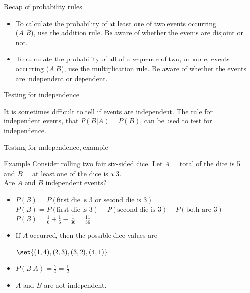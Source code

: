 \documentclass[xcolor=table]{beamer}
\begin{document}
\begin{frame}{Recap of probability rules}
\begin{block}{}
\begin{itemize}
\item To calculate the probability of at least one of two events occurring\\ ($A$  $B$), use the addition rule. Be aware of whether the events are disjoint or not.

\pause
\item To calculate  the probability of all of a sequence of two, or more, events occurring ($A$  $B$), use the multiplication rule. Be aware of whether the events are independent or dependent.
\end{itemize}
\end{block}
\end{frame}

\begin{frame}{Testing for independence}
\begin{block}{}
It is sometimes difficult to tell if events are independent. The rule for independent events, that $P(B|A) = P(B)$, can be used to test for independence.
\end{block}
\end{frame}

\begin{frame}{Testing for independence, example}
\begin{exampleblock}{Example}
Consider rolling two fair six-sided dice. Let $A$ = total of the dice is 5 and $B$ = at least one of the dice is a 3.\\
\medskip
Are $A$ and $B$ independent events?
\begin{itemize}
\pause
\item $P(B) = P(\text{first die is 3 or second die is 3}) $\\
$P(B) = P(\text{first die is 3}) + P(\text{second die is 3}) - P(\text{both are 3}) $\\
$P(B) = \frac 1 6 + \frac 1 6 - \frac 1 {36} = \frac {11}{36}$
\pause
\item If $A$ occurred, then the possible dice values are\\ 
{\centering $\set{(1,4), (2,3), (3,2), (4,1)}$\par }

\pause
\item $P(B|A) = \frac 2 4 = \frac 1 2$

\pause
\item $A$ and $B$ are not independent.
\end{itemize} 
\end{exampleblock}
\end{frame}
\end{document}
